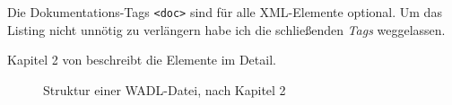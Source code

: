 Die Dokumentations-Tags \texttt{<doc>} sind für alle XML-Elemente optional.
Um das Listing nicht unnötig zu verlängern habe ich die schließenden \emph{Tags} weggelassen.

Kapitel 2 von \cite{hadleyWADL} beschreibt die Elemente im Detail.

\newpage
\begin{figure}[!htb]
    \centering
    \resizebox{\textwidth}{!}{
        
    }
    \caption{Struktur einer WADL-Datei, nach Kapitel 2 \cite{hadleyWADL}}
    \label{fig:wadlstructure}
\end{figure}